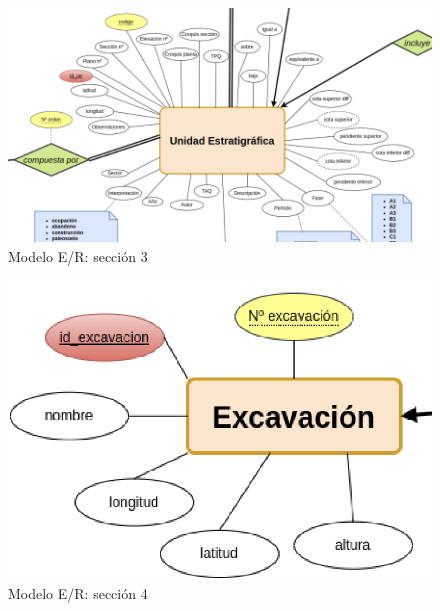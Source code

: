        \begin{figure}[H]
            \centering
            \includegraphics[scale=0.40]{imagenes/E-R3.png}
            \caption{Modelo E/R: sección 3}
            \label{fig:e-rmodel3}
        \end{figure}

        \begin{figure}[H]
            \centering
            \includegraphics[scale=0.50]{imagenes/E-R4.png}
            \caption{Modelo E/R: sección 4}
            \label{fig:e-rmodel4}
        \end{figure}

